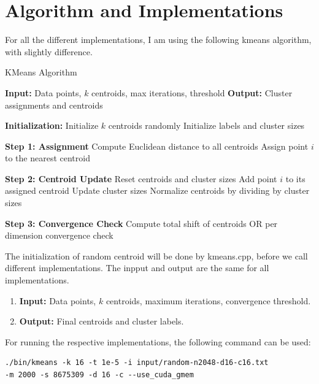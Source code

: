 \documentclass[letterpaper,12pt]{article}
\theoremstyle{remark}
\begin{document}
\section{Algorithm and Implementations}
For all the different implementations, I am using the following kmeans algorithm, with slightly difference.
\begin{algorithm} 
\caption{KMeans Algorithm}\label{kmeans}
\begin{algorithmic}[1]
\State \textbf{Input:} Data points, $k$ centroids, max iterations, threshold
\State \textbf{Output:} Cluster assignments and centroids

\State \textbf{Initialization:}
\State Initialize $k$ centroids randomly
\State Initialize labels and cluster sizes

    \State \textbf{Step 1: Assignment}
        \State Compute Euclidean distance to all centroids
        \State Assign point $i$ to the nearest centroid
    \EndFor

    \State \textbf{Step 2: Centroid Update}
    \State Reset centroids and cluster sizes
        \State Add point $i$ to its assigned centroid
        \State Update cluster sizes
    \EndFor
    \State Normalize centroids by dividing by cluster sizes

    \State \textbf{Step 3: Convergence Check}
    \State Compute total shift of centroids OR per dimension convergence check
    
\EndFor
\end{algorithmic}
\end{algorithm}
\clearpage


The initialization of random centroid will be done by kmeans.cpp, before we call different implementations. The inpput and output are the same for all implementations.


\begin{enumerate}
    \item \textbf{Input:} Data points, $k$ centroids, maximum iterations, convergence threshold.
    \item \textbf{Output:} Final centroids and cluster labels.
\end{enumerate}

For running the respective implementations, the following command can be used:

\begin{verbatim}
./bin/kmeans -k 16 -t 1e-5 -i input/random-n2048-d16-c16.txt 
-m 2000 -s 8675309 -d 16 -c --use_cuda_gmem
\end{verbatim}
\end{document}
